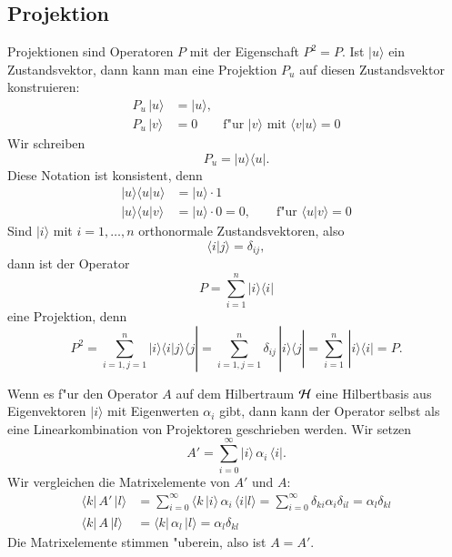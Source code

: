 \subsection{Projektion}
Projektionen sind Operatoren $P$ mit der Eigenschaft $P^2=P$.
Ist $|u\rangle$ ein Zustandsvektor, dann kann man eine Projektion $P_u$
auf diesen Zustandsvektor konstruieren:
\begin{align*}
P_u\,|u\rangle&=|u\rangle,\\
P_u\,|v\rangle&=0\qquad \text{f"ur $|v\rangle$ mit $\langle v|u\rangle=0$}
\end{align*}
Wir schreiben 
\[
P_u=
|u\rangle\langle u|
.
\]
Diese Notation ist konsistent, denn 
\begin{align*}
|u\rangle\langle u|u\rangle&=|u\rangle\cdot 1\\
|u\rangle\langle u|v\rangle&=|u\rangle\cdot 0=0,\qquad
\text{f"ur $\langle u|v\rangle = 0$}
\end{align*}
Sind $|i\rangle$ mit $i=1,\dots, n$ orthonormale Zustandsvektoren, also
\[
\langle i|j\rangle =\delta_{ij},
\]
dann ist der Operator
\[
P=\sum_{i=1}^n |i\rangle \langle i|
\]
eine Projektion, denn
\[
P^2=
\sum_{i=1, j = 1}^n
|i\rangle \langle i|j\rangle \langle j|
=
\sum_{i=1, j = 1}^n
\delta_{ij} \,|i\rangle\langle j|=\sum_{i=1}^n\,|i\rangle\langle i|=P.
\]

Wenn es f"ur den Operator $A$ auf dem Hilbertraum $\cal H$ eine
Hilbertbasis aus Eigenvektoren $|i\rangle$ mit Eigenwerten $\alpha_i$ gibt,
dann kann der Operator selbst
als eine Linearkombination von Projektoren geschrieben werden. Wir setzen
\[
A'=\sum_{i=0}^\infty |i\rangle \,\alpha_i\, \langle i|.
\]
Wir vergleichen die Matrixelemente von $A'$ und $A$:
\begin{align*}
\langle k|\, A' \,|l\rangle
&=
\sum_{i=0}^\infty \langle k\,|i\rangle\, \alpha_i \,\langle i|l\rangle
=\sum_{i=0}^\infty \delta_{ki}\alpha_i\delta_{il}
=\alpha_l\delta_{kl}
\\
\langle k|\,A\,|l\rangle
&=
\langle k|\,\alpha_l\,|l\rangle=\alpha_l\delta_{kl}
\end{align*}
Die Matrixelemente stimmen "uberein, also ist $A=A'$.

